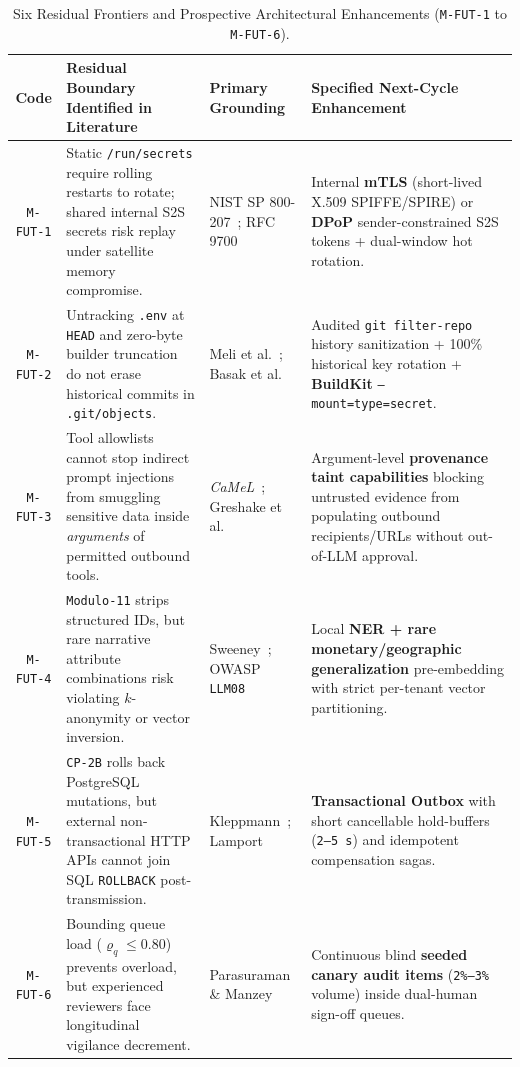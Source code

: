 \documentclass[10pt,twocolumn]{article}
\begin{document}
\begin{table}[t]
\centering
\caption{Six Residual Frontiers and Prospective Architectural Enhancements (\texttt{M-FUT-1} to \texttt{M-FUT-6}).}
\label{tab:mfut}
\footnotesize
\begin{tabularx}{\textwidth}{@{}c Y l Y@{}}
\toprule
\textbf{Code} & \textbf{Residual Boundary Identified in Literature} & \textbf{Primary Grounding} & \textbf{Specified Next-Cycle Enhancement} \\
\midrule
\texttt{M-FUT-1} & Static \texttt{/run/secrets} require rolling restarts to rotate; shared internal S2S secrets risk replay under satellite memory compromise. & NIST SP 800-207~\cite{R16}; RFC 9700~\cite{R28} & Internal \textbf{mTLS} (short-lived X.509 SPIFFE/SPIRE) or \textbf{DPoP} sender-constrained S2S tokens + dual-window hot rotation. \\
\addlinespace[2pt]
\texttt{M-FUT-2} & Untracking \texttt{.env} at \texttt{HEAD} and zero-byte builder truncation do not erase historical commits in \texttt{.git/objects}. & Meli et al.~\cite{R15}; Basak et al.~\cite{R20} & Audited \texttt{git filter-repo} history sanitization + 100\% historical key rotation + \textbf{BuildKit} \texttt{--mount=type=secret}. \\
\addlinespace[2pt]
\texttt{M-FUT-3} & Tool allowlists cannot stop indirect prompt injections from smuggling sensitive data inside \emph{arguments} of permitted outbound tools. & \emph{CaMeL}~\cite{R27}; Greshake et al.~\cite{R22} & Argument-level \textbf{provenance taint capabilities} blocking untrusted evidence from populating outbound recipients/URLs without out-of-LLM approval. \\
\addlinespace[2pt]
\texttt{M-FUT-4} & \texttt{Modulo-11} strips structured IDs, but rare narrative attribute combinations risk violating $k$-anonymity or vector inversion. & Sweeney~\cite{R07}; OWASP \texttt{LLM08}~\cite{R29} & Local \textbf{NER + rare monetary/geographic generalization} pre-embedding with strict per-tenant vector partitioning. \\
\addlinespace[2pt]
\texttt{M-FUT-5} & \texttt{CP-2B} rolls back PostgreSQL mutations, but external non-transactional HTTP APIs cannot join SQL \texttt{ROLLBACK} post-transmission. & Kleppmann~\cite{R13}; Lamport~\cite{R03} & \textbf{Transactional Outbox} with short cancellable hold-buffers (\texttt{2--5 s}) and idempotent compensation sagas. \\
\addlinespace[2pt]
\texttt{M-FUT-6} & Bounding queue load ($\varrho_q \le 0.80$) prevents overload, but experienced reviewers face longitudinal vigilance decrement. & Parasuraman \& Manzey~\cite{R08} & Continuous blind \textbf{seeded canary audit items} (\texttt{2\%--3\%} volume) inside dual-human sign-off queues. \\
\bottomrule
\end{tabularx}
\end{table}
\end{document}
